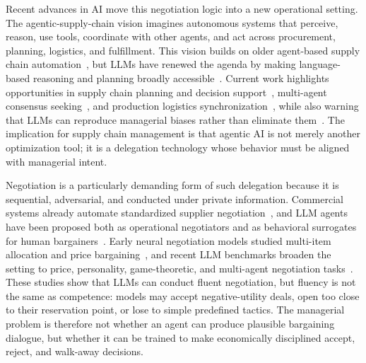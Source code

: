 \documentclass{interact}
\theoremstyle{plain}
\theoremstyle{definition}
\theoremstyle{remark}
\begin{document}
Recent advances in AI move this negotiation logic into a new operational setting. The agentic-supply-chain vision imagines autonomous systems that perceive, reason, use tools, coordinate with other agents, and act across procurement, planning, logistics, and fulfillment. This vision builds on older agent-based supply chain automation~\cite{xu2021bots}, but LLMs have renewed the agenda by making language-based reasoning and planning broadly accessible~\cite{bubeck2023sparks}. Current work highlights opportunities in supply chain planning and decision support~\cite{menache2025generative}, multi-agent consensus seeking~\cite{jannelli2024agentic}, and production logistics synchronization~\cite{li2025chatsync}, while also warning that LLMs can reproduce managerial biases rather than eliminate them~\cite{chen2025manager}. The implication for supply chain management is that agentic AI is not merely another optimization tool; it is a delegation technology whose behavior must be aligned with managerial intent.

Negotiation is a particularly demanding form of such delegation because it is sequential, adversarial, and conducted under private information. Commercial systems already automate standardized supplier negotiation~\cite{revilla2023ai}, and LLM agents have been proposed both as operational negotiators and as behavioral surrogates for human bargainers~\cite{kirshner2024artificial,bianchi2024negotiationarena,yin2026negotiation}. Early neural negotiation models studied multi-item allocation and price bargaining~\cite{lewis2017deal,he2018decoupling}, and recent LLM benchmarks broaden the setting to price, personality, game-theoretic, and multi-agent negotiation tasks~\cite{xia2024measuring,kwon2024llmseffectivenegotiators,noh2024personalities,chatterjee2024agreemate,hua2024gametheoretic}. These studies show that LLMs can conduct fluent negotiation, but fluency is not the same as competence: models may accept negative-utility deals, open too close to their reservation point, or lose to simple predefined tactics. The managerial problem is therefore not whether an agent can produce plausible bargaining dialogue, but whether it can be trained to make economically disciplined accept, reject, and walk-away decisions.
\end{document}
